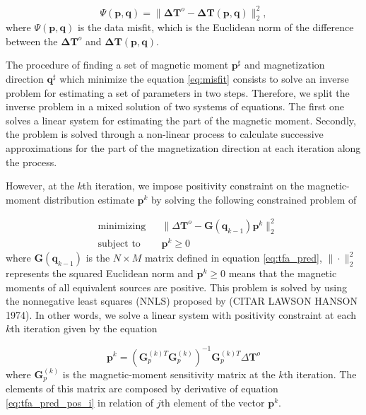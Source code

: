 \begin{equation}
\Psi(\mathbf{p}, \mathbf{q}) =  \parallel \mathbf{\Delta T}^o - \mathbf{\Delta T} (\mathbf{p}, \mathbf{q}) \parallel_{2}^{2},
\label{eq:misfit}
\end{equation}
where $\Psi(\mathbf{p}, \mathbf{q})$ is the data misfit, which is the Euclidean norm of the difference between the $\mathbf{\Delta T}^o$ and $\mathbf{\Delta T} (\mathbf{p}, \mathbf{q})$.

The procedure of finding a set of magnetic moment $\mathbf{p}^\sharp$ and magnetization direction $\mathbf{q}^\sharp$ which minimize the equation \ref{eq:misfit} consists to solve an inverse problem for estimating a set of parameters in two steps. Therefore, we split the inverse problem in a mixed solution of two systems of equations. The first one solves a linear system for estimating the part of the magnetic moment. Secondly, the problem is solved through a non-linear process to calculate successive approximations for the part of the magnetization direction at each iteration along the process. 

However, at the $k$th iteration, we impose positivity constraint on the magnetic-moment distribution estimate $\mathbf{p}^k$ by solving the following constrained problem of

\begin{equation}
	\begin{aligned}
		& \text{minimizing}
		& &\lVert \Delta \mathbf{T}^o - \mathbf{G}(\mathbf{q}_{k-1}) \mathbf{p}^k \rVert_{2}^{2} \\
		& \text{subject to}
		& & \mathbf{p}^k \geqslant 0
	\end{aligned}
	\label{eq:positivity}
\end{equation}
where $\mathbf{G}(\mathbf{q}_{k-1})$ is the $N \times M$ matrix defined in equation \ref{eq:tfa_pred},
$\| \cdot \|_{2}^{2}$ represents the squared Euclidean norm and $\mathbf{p}^k \geqslant 0$ means that the magnetic moments of all equivalent sources are positive. This problem is solved by using the nonnegative least squares (NNLS) proposed by (CITAR LAWSON HANSON 1974). In other words, we solve a linear system with positivity constraint at each $k$th iteration given by the equation 

\begin{equation}
	\mathbf{p}^k = \left(\mathbf{G}_{p}^{(k)T} \mathbf{G}_{p}^{(k)}\right)^{-1} \mathbf{G}_{p}^{(k)T}  \Delta \mathbf{T}^o
	\label{eq:linsys_p}
\end{equation}
where $\mathbf{G}_p^{(k)}$ is the magnetic-moment sensitivity matrix at the $k$th iteration. The elements of this matrix are composed by derivative of equation \ref{eq:tfa_pred_pos_i} in relation of $j$th element of the vector $\mathbf{p}^k$.

